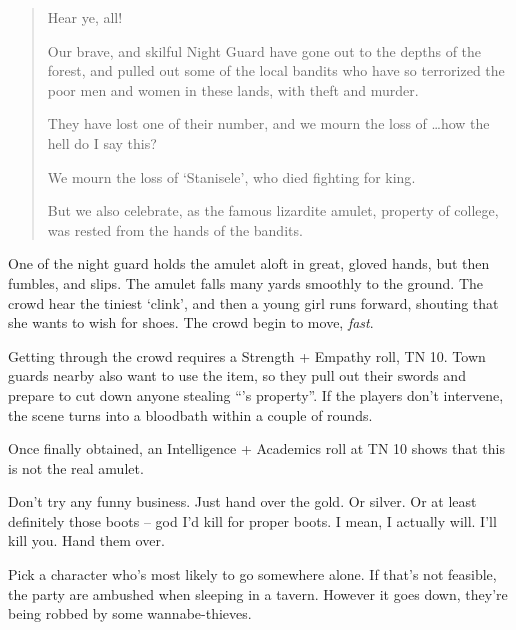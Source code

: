 \begin{multicols}{2}
\begin{boxtext}
	\begin{quotation}
		Hear ye, all!

		Our brave, and skilful Night Guard have gone out to the depths of the forest, and pulled out some of the local bandits who have so terrorized the poor men and women in these lands, with theft and murder.

		They have lost one of their number, and we mourn the loss of \ldots how the hell do I say this?

		We mourn the loss of `Stanisele', who died fighting for \gls{king}.

		But we also celebrate, as the famous lizardite amulet, property of \gls{college}, was rested from the hands of the bandits.

	\end{quotation}

	One of the night guard holds the amulet aloft in great, gloved hands, but then fumbles, and slips.  The amulet falls many yards smoothly to the ground.  The crowd hear the tiniest `clink', and then a young girl runs forward, shouting that she wants to wish for shoes.  The crowd begin to move, \emph{fast}.

\end{boxtext}

Getting through the crowd requires a Strength + Empathy roll, TN 10.
Town guards nearby also want to use the item, so they pull out their swords and prepare to cut down anyone stealing ``'s property''.
If the players don't intervene, the scene turns into a bloodbath within a couple of rounds.

Once finally obtained, an Intelligence + Academics roll at TN 10 shows that this is not the real amulet.


\begin{speechtext}

	Don't try any funny business.  Just hand over the gold. Or silver.  Or at least definitely those boots -- god I'd kill for proper boots.  I mean, I actually will.  I'll kill you.  Hand them over.

\end{speechtext}

Pick a character who's most likely to go somewhere alone.  If that's not feasible, the party are ambushed when sleeping in a tavern.
However it goes down, they're being robbed by some wannabe-thieves.


\end{multicols}

